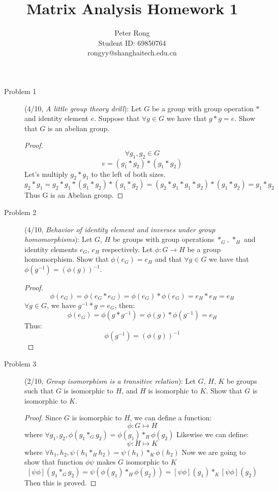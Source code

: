 \documentclass{article}
\title{Matrix Analysis Homework 1}
\author{Peter Rong \\ Student ID: 69850764 \\ rongyy@shanghaitech.edu.cn}
\begin{document}
\maketitle

\begin{description}
	\item[Problem 1](4/10, \textit{A little group theory drill}):	
	Let $G$ be a group with group operation $*$ and identity element $e$.
	Suppose that $\forall g \in G$ we have that $g * g = e$. Show that $G$ is an abelian group.
	\begin{proof}

		$$ \forall g_1, g_2 \in G $$
		$$ e = (g_1 * g_2) * (g_1 * g_2) $$
		Let's multiply $g_2 * g_1$ to the left of both sizes.
		$$ g_2 * g_1 
			= g_2 * g_1 * (g_1 * g_2) * (g_1 * g_2)
			= (g_2 * g_1 * g_1 * g_2) * (g_1 * g_2)
			= g_1 * g_2
		$$
		Thus G is an Abelian group.

	\end{proof}

	\item[Problem 2](4/10, \textit{Behavior of identity element and inverses under group homomorphisms}):
	Let $G$, $H$ be groups with group operations $*_G$, $*_H$ and identity
	elements $e_G$, $e_H$ respectively. Let $\phi:G\to H$ be a group homomorphism. Show that $\phi(e_G)=e_H$ and that $\forall g\in G$ we have that $\phi(g^{-1})=(\phi(g))^{-1}$.
	\begin{proof}

		$$ \phi(e_G) = \phi(e_G*e_G)
			= \phi(e_G) * \phi(e_G)
			= e_H * e_H
			= e_H
		$$
		$ \forall g \in G $, we have $ g^{-1} * g = e_G$, then:
			$$ \phi(e_G) = \phi(g*g^{-1})
				=	\phi(g) * \phi(g^{-1})
				= e_H
			$$
		Thus:
			$$ \phi(g^{-1}) = (\phi(g))^{-1} $$

	\end{proof}

	\item[Problem 3](2/10, \textit{Group isomorphism is a transitive relation}):
	Let $G$, $H$, $K$ be groups such that $G$ is isomorphic to $H$, and $H$ is isomorphic to $K$. Show that $G$ is isomorphic to $K$.
	\begin{proof}

		Since $G$ is isomorphic to $H$, we can define a function:
			$$ \phi: G \mapsto H $$
		where $ \forall g_1, g_2, \phi(g_1 *_G g_2) = \phi(g_1) *_H \phi(g_2)$
		Likewise we can define:
			$$ \psi: H \mapsto K $$
		where $ \forall h_1, h_2, \psi(h_1 *_H h_2) = \psi(h_1) *_K \phi(h_2)$
		Now we are going to show that function $\phi\psi$ makes $G$ isomorphic to $K$
		$$ [\psi\phi](g_1 *_G g_2)
			= \psi(\phi(g_1) *_H \phi(g_2))
			= [\psi\phi](g_1) *_K [\psi\phi](g_2)
		$$
		Then this is proved.

	\end{proof}

\end{description}
\end{document}
